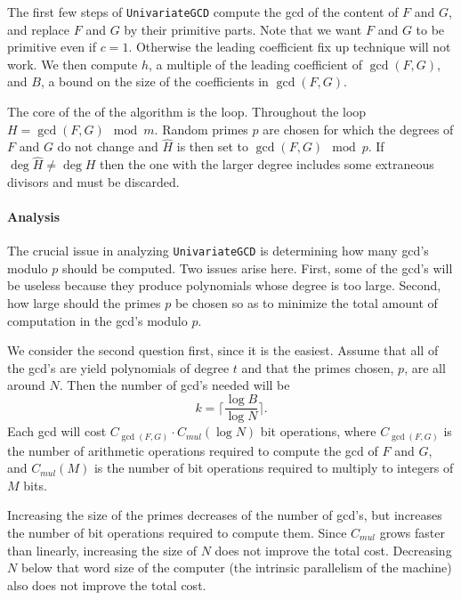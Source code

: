 The first few steps of {\tt UnivariateGCD} compute the {\sc gcd} of the
content of $F$ and $G$, and replace $F$ and $G$ by  their primitive
parts.  Note that we want $F$ and $G$ to be primitive even if $c= 1$.
Otherwise the leading coefficient fix up technique will not work.  We
then compute $h$, a multiple of the leading coefficient of $\gcd(F,
G)$, and $B$, a bound on the size of the coefficients in $\gcd(F, G)$.

The core of the of the algorithm is the loop.  Throughout the loop $H
= \gcd(F, G) \mod{m}$.  Random primes $p$ are chosen for which the
degrees of $F$ and $G$ do not change and $\hat{H}$ is then set to
$\gcd(F, G) \mod{p}$.  If $\deg \hat{H} \not= \deg H$ then the one
with the larger degree includes some extraneous divisors and must be
discarded.

\paragraph{Analysis}

The crucial issue in analyzing {\tt UnivariateGCD} is determining how
many {\sc gcd}'s modulo $p$ should be computed.  Two issues arise here.
First, some of the {\sc gcd}'s will be useless because they produce
polynomials whose degree is too large.  Second, how large should the
primes $p$ be chosen so as to minimize the total amount of computation
in the {\sc gcd}'s modulo $p$.

We consider the second question first, since it is the easiest.
Assume that all of the {\sc gcd}'s are yield polynomials of degree $t$ and
that the primes chosen, $p$, are all around $N$.  Then the number of
{\sc gcd}'s needed will be 
\[
k = \lceil \frac{\log B}{\log N} \rceil.
\]
Each {\sc gcd} will cost $C_{\gcd(F,G)} \cdot C_{mul}(\log N)$ bit
operations, where $C_{\gcd(F,G)}$ is the number of arithmetic
operations required to compute the {\sc gcd} of $F$ and $G$, and
$C_{mul}(M)$ is the number of bit operations required to multiply to
integers of $M$ bits.  

Increasing the size of the primes decreases of the number of {\sc gcd}'s,
but increases the number of bit operations required to compute them.
Since $C_{mul}$ grows faster than linearly, increasing the size of $N$
does not improve the total cost.  Decreasing $N$ below that word size
of the computer (the intrinsic parallelism of the machine) also does
not improve the total cost.

